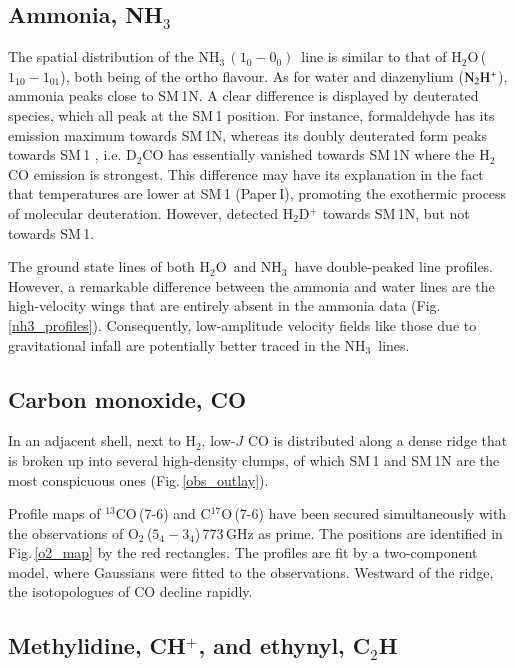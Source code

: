 \documentclass{aa}
\newcommand{\molh}{H$_{2}$}                              %
\newcommand{\water}{H$_{2}$O}
\newcommand{\molo}{O$_{2}$}                     %
\newcommand{\ammonia}{{\rm NH}$_3$}
\newcommand{\ettnoll}{{\rm NH}$_3\,(1_0 - 0_0)$}
\newcommand{\ntwohp}{${\rm N_2H^+}$}
\begin{document}
\subsection{Ammonia, \ammonia}

The spatial distribution of the \ettnoll\ line is similar to that of \water\,($1_{10}-1_{01}$), both being of the ortho flavour. As for water and diazenylium (\ntwohp), ammonia peaks close to SM\,1N. A clear difference is displayed by deuterated species, which all peak at the SM\,1 position. For instance,  formaldehyde has its emission maximum towards SM\,1N, whereas its doubly deuterated form peaks towards SM\,1 \citep{bergman2011a}, i.e. D$_2$CO has essentially vanished towards SM\,1N where the H$_2$CO emission is strongest. This difference may have its explanation in the fact that temperatures are lower at SM\,1 (Paper\,I), promoting the exothermic process of molecular deuteration. However, \citet{friesen2014} detected H$_2$D$^+$ towards SM\,1N, but not towards SM\,1. 


The ground state lines of both \water\ and \ammonia\ have double-peaked line profiles. However, a remarkable difference between the ammonia and water lines are the high-velocity wings that are entirely absent in the ammonia data (Fig.\,\ref{nh3_profiles}). Consequently, low-amplitude velocity fields like those due to gravitational infall are potentially better traced in the \ammonia\ lines.


\subsection{Carbon monoxide, CO}

In an adjacent shell, next to \molh, low-$J$ CO is distributed along a dense ridge that is broken up into several high-density clumps, of which SM\,1 and SM\,1N  are the most conspicuous ones (Fig.\,\ref{obs_outlay}).
 
Profile maps of  $^{13}$CO\,(7-6) and C$^{17}$O\,(7-6) have been secured simultaneously with the observations of \molo\,($5_4-3_4$)\,773\,GHz as prime. The positions are identified in Fig.\,\ref{o2_map} by the red rectangles. The profiles are fit by a two-component model, where Gaussians were fitted to the observations. Westward of the ridge, the isotopologues of CO decline rapidly.

\subsection{Methylidine, CH$^+$, and ethynyl, C$_2$H}
\end{document}

